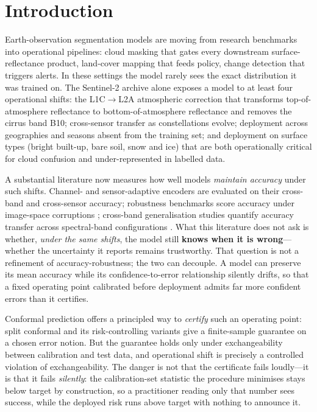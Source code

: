 \documentclass[preprint,3p,times]{elsarticle}
\begin{document}
\section{Introduction}
Earth-observation segmentation models are moving from research benchmarks into operational pipelines: cloud masking that gates every downstream surface-reflectance product, land-cover mapping that feeds policy, change detection that triggers alerts. In these settings the model rarely sees the exact distribution it was trained on. The Sentinel-2 archive alone exposes a model to at least four operational shifts: the L1C$\to$L2A atmospheric correction that transforms top-of-atmosphere reflectance to bottom-of-atmosphere reflectance and removes the cirrus band B10; cross-sensor transfer as constellations evolve; deployment across geographies and seasons absent from the training set; and deployment on surface types (bright built-up, bare soil, snow and ice) that are both operationally critical for cloud confusion and under-represented in labelled data.

A substantial literature now measures how well models \emph{maintain accuracy} under such shifts. Channel- and sensor-adaptive encoders \citep{xiong2024dofa,waldmann2025panopticon,francis2021sensei,bao2024channelvit} are evaluated on their cross-band and cross-sensor accuracy; robustness benchmarks score accuracy under image-space corruptions \citep{li2025reobench}; cross-band generalisation studies quantify accuracy transfer across spectral-band configurations \citep{tamazyan2025geocrossbench}. What this literature does not ask is whether, \emph{under the same shifts}, the model still \textbf{knows when it is wrong}---whether the uncertainty it reports remains trustworthy. That question is not a refinement of accuracy-robustness; the two can decouple. A model can preserve its mean accuracy while its confidence-to-error relationship silently drifts, so that a fixed operating point calibrated before deployment admits far more confident errors than it certifies.

Conformal prediction offers a principled way to \emph{certify} such an operating point: split conformal and its risk-controlling variants give a finite-sample guarantee on a chosen error notion. But the guarantee holds only under exchangeability between calibration and test data, and operational shift is precisely a controlled violation of exchangeability. The danger is not that the certificate fails loudly---it is that it fails \emph{silently}: the calibration-set statistic the procedure minimises stays below target by construction, so a practitioner reading only that number sees success, while the deployed risk runs above target with nothing to announce it.
\end{document}
